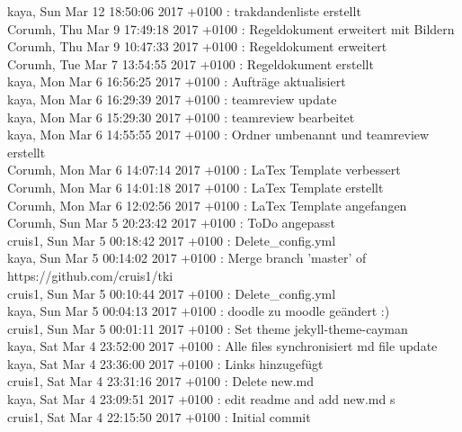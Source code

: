 kaya, Sun Mar 12 18:50:06 2017 +0100 : trakdandenliste erstellt\\
Corumh, Thu Mar 9 17:49:18 2017 +0100 : Regeldokument erweitert mit Bildern\\
Corumh, Thu Mar 9 10:47:33 2017 +0100 : Regeldokument erweitert\\
Corumh, Tue Mar 7 13:54:55 2017 +0100 : Regeldokument erstellt\\
kaya, Mon Mar 6 16:56:25 2017 +0100 : Aufträge aktualisiert\\
kaya, Mon Mar 6 16:29:39 2017 +0100 : teamreview update\\
kaya, Mon Mar 6 15:29:30 2017 +0100 : teamreview bearbeitet\\
kaya, Mon Mar 6 14:55:55 2017 +0100 : Ordner umbenannt und teamreview erstellt\\
Corumh, Mon Mar 6 14:07:14 2017 +0100 : LaTex Template verbessert\\
Corumh, Mon Mar 6 14:01:18 2017 +0100 : LaTex Template erstellt\\
Corumh, Mon Mar 6 12:02:56 2017 +0100 : LaTex Template angefangen\\
Corumh, Sun Mar 5 20:23:42 2017 +0100 : ToDo angepasst\\
cruis1, Sun Mar 5 00:18:42 2017 +0100 : Delete\_config.yml\\
kaya, Sun Mar 5 00:14:02 2017 +0100 : Merge branch 'master' of https://github.com/cruis1/tki\\
cruis1, Sun Mar 5 00:10:44 2017 +0100 : Delete\_config.yml\\
kaya, Sun Mar 5 00:04:13 2017 +0100 : doodle zu moodle geändert :)\\
cruis1, Sun Mar 5 00:01:11 2017 +0100 : Set theme jekyll-theme-cayman\\
kaya, Sat Mar 4 23:52:00 2017 +0100 : Alle files synchronisiert md file update\\
kaya, Sat Mar 4 23:36:00 2017 +0100 : Links hinzugefügt\\
cruis1, Sat Mar 4 23:31:16 2017 +0100 : Delete new.md\\
kaya, Sat Mar 4 23:09:51 2017 +0100 : edit readme and add new.md s\\
cruis1, Sat Mar 4 22:15:50 2017 +0100 : Initial commit\\

